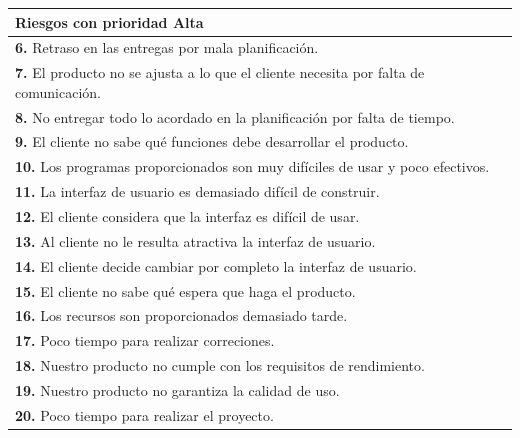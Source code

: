 \documentclass[spanish,a4paper,11pt, twoside]{report}	%
\begin{document}
			\begin{tabular}{|p{12cm}|}
				\hline
				\textbf{Riesgos con prioridad Alta}\\ \hline \hline
				\textbf{6.} Retraso en las entregas por mala planificación.\\ \hline 
				\textbf{7.} El producto no se ajusta a lo que el cliente necesita por falta de comunicación. \\ \hline
				\textbf{8.}  No entregar todo lo acordado en la planificación por falta de tiempo.\\ \hline
				\textbf{9.} El cliente no sabe qué funciones debe desarrollar el producto. \\ \hline
				\textbf{10.} Los programas proporcionados son muy difíciles de usar y poco efectivos. \\ \hline
				\textbf{11.} La interfaz de usuario es demasiado difícil de construir. \\ \hline
				\textbf{12.} El cliente considera que la interfaz es difícil de usar.		\\ \hline
				\textbf{13.} Al cliente no le resulta atractiva la interfaz de usuario.			\\ \hline
				\textbf{14.} El cliente decide cambiar por completo la interfaz de usuario.			\\ \hline
				\textbf{15.} El cliente no sabe qué espera que haga el producto.			\\ \hline
				\textbf{16. }Los recursos son proporcionados demasiado tarde. 				\\ \hline
				\textbf{17. }Poco tiempo para realizar correciones. \\ \hline
				\textbf{18. }Nuestro producto no cumple con los requisitos de rendimiento. \\ \hline
				\textbf{19. }Nuestro producto no garantiza la calidad de uso. \\ \hline
				\textbf{20. }Poco tiempo para realizar el proyecto. \\ \hline

			\end{tabular}
				\ \\
				\ \\
			
\end{document}
